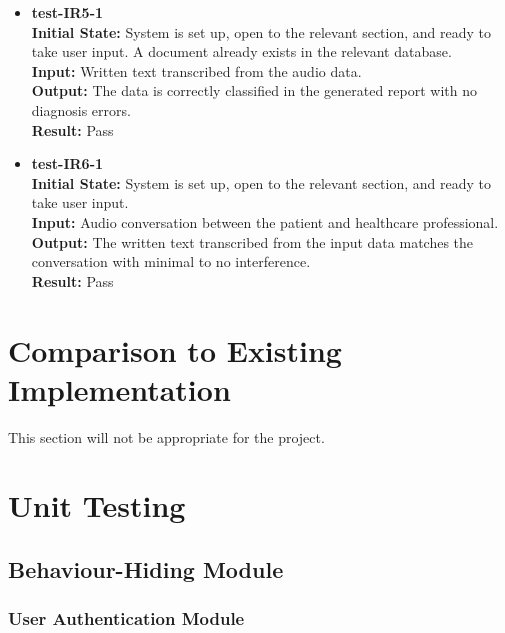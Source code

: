 \documentclass[12pt, titlepage]{article}
\begin{document}
\begin{itemize}
\item \textbf{test-IR5-1} \label{test-IR5-1} \\ 
\textbf{Initial State:} System is set up, open to the relevant section, and ready to take user input. A document already exists in the relevant database. \\
\textbf{Input:} Written text transcribed from the audio data. \\
\textbf{Output:} The data is correctly classified in the generated report with no diagnosis errors. \\
\textbf{Result:} Pass \\
\end{itemize}

\begin{itemize}
\item \textbf{test-IR6-1} \label{test-IR6-1} \\
\textbf{Initial State:} System is set up, open to the relevant section, and ready to take user input. \\
\textbf{Input:} Audio conversation between the patient and healthcare professional. \\
\textbf{Output:} The written text transcribed from the input data matches the conversation with minimal to no interference. \\
\textbf{Result:} Pass \\
\end{itemize}



\section{Comparison to Existing Implementation}	

This section will not be appropriate for the project.

\section{Unit Testing}

\subsection{Behaviour-Hiding Module}

\subsubsection{User Authentication Module}
\end{document}
